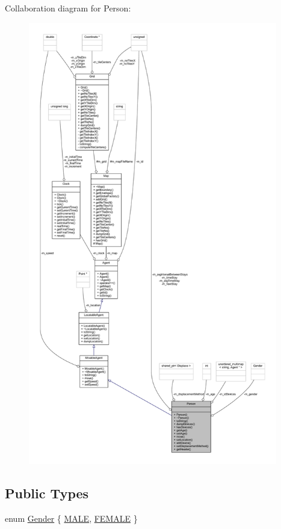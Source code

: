Collaboration diagram for Person\+:
\nopagebreak
\begin{figure}[H]
\begin{center}
\leavevmode
\includegraphics[height=550pt]{class_person__coll__graph}
\end{center}
\end{figure}
\subsection*{Public Types}
\begin{DoxyCompactItemize}
\item 
enum \hyperlink{class_person_aff84ca16bd4dbf364614d86f20b29dd2}{Gender} \{ \hyperlink{class_person_aff84ca16bd4dbf364614d86f20b29dd2a16691f7cc6595f87b71d9b43ad23fcb4}{M\+A\+LE}, 
\hyperlink{class_person_aff84ca16bd4dbf364614d86f20b29dd2a8ee21010fb2d8e8794ef72be368da064}{F\+E\+M\+A\+LE}
 \}
\end{DoxyCompactItemize}
